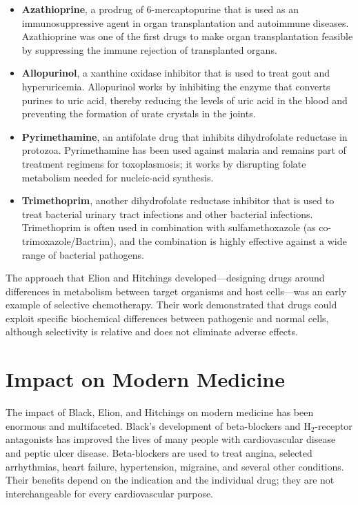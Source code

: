 \begin{itemize}
 \item \textbf{Azathioprine}, a prodrug of 6-mercaptopurine that is used as an immunosuppressive agent in organ transplantation and autoimmune diseases. Azathioprine was one of the first drugs to make organ transplantation feasible by suppressing the immune rejection of transplanted organs.
 \item \textbf{Allopurinol}, a xanthine oxidase inhibitor that is used to treat gout and hyperuricemia. Allopurinol works by inhibiting the enzyme that converts purines to uric acid, thereby reducing the levels of uric acid in the blood and preventing the formation of urate crystals in the joints.
 \item \textbf{Pyrimethamine}, an antifolate drug that inhibits dihydrofolate reductase in protozoa. Pyrimethamine has been used against malaria and remains part of treatment regimens for toxoplasmosis; it works by disrupting folate metabolism needed for nucleic-acid synthesis.
 \item \textbf{Trimethoprim}, another dihydrofolate reductase inhibitor that is used to treat bacterial urinary tract infections and other bacterial infections. Trimethoprim is often used in combination with sulfamethoxazole (as co-trimoxazole/Bactrim), and the combination is highly effective against a wide range of bacterial pathogens.
\end{itemize}

The approach that Elion and Hitchings developed---designing drugs around differences in metabolism between target organisms and host cells---was an early example of selective chemotherapy. Their work demonstrated that drugs could exploit specific biochemical differences between pathogenic and normal cells, although selectivity is relative and does not eliminate adverse effects.

\section{Impact on Modern Medicine}

The impact of Black, Elion, and Hitchings on modern medicine has been enormous and multifaceted. Black's development of beta-blockers and H$_2$-receptor antagonists has improved the lives of many people with cardiovascular disease and peptic ulcer disease. Beta-blockers are used to treat angina, selected arrhythmias, heart failure, hypertension, migraine, and several other conditions. Their benefits depend on the indication and the individual drug; they are not interchangeable for every cardiovascular purpose.

